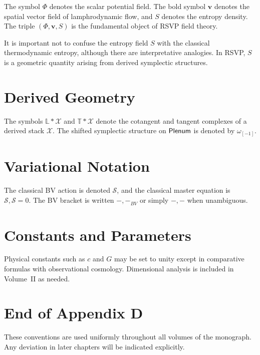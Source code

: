 The symbol $\Phi$ denotes the scalar potential field.  The bold symbol $\mathbf v$ denotes the spatial vector field of lamphrodynamic flow, and $S$ denotes the entropy density.  The triple $(\Phi,\mathbf v,S)$ is the fundamental object of RSVP field theory.

\begin{remark}
It is important not to confuse the entropy field $S$ with the classical thermodynamic entropy, although there are interpretative analogies.  In RSVP, $S$ is a geometric quantity arising from derived symplectic structures.
\end{remark}

\section{Derived Geometry}

The symbols $\mathbb{L}*\mathcal X$ and $\mathbb{T}*\mathcal X$ denote the cotangent and tangent complexes of a derived stack $\mathcal X$.  The shifted symplectic structure on $\mathsf{Plenum}$ is denoted by $\omega_{[-1]}$.

\section{Variational Notation}

The classical BV action is denoted $\mathcal{S}$, and the classical master equation is ${\mathcal S,\mathcal S}=0$.  The BV bracket is written ${-,-}_{BV}$ or simply ${-,-}$ when unambiguous.

\section{Constants and Parameters}

Physical constants such as $c$ and $G$ may be set to unity except in comparative formulas with observational cosmology.  Dimensional analysis is included in Volume~II as needed.

\section{End of Appendix D}

These conventions are used uniformly throughout all volumes of the monograph.  Any deviation in later chapters will be indicated explicitly.

